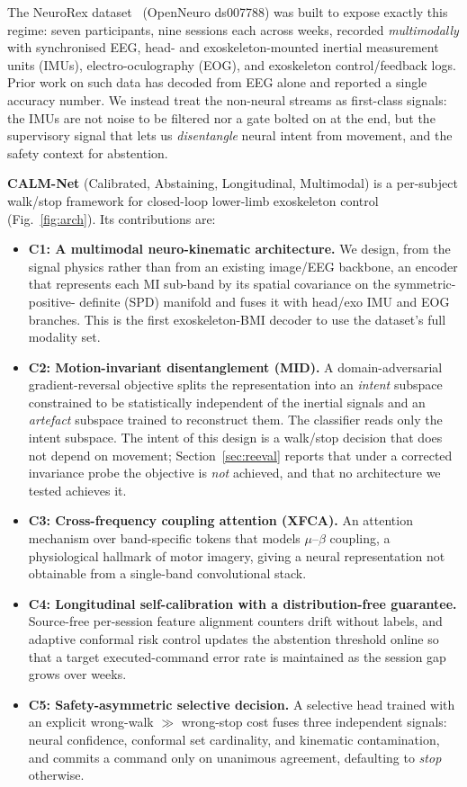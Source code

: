 \documentclass[journal]{IEEEtran}
\begin{document}
The NeuroRex dataset~\cite{sarkar2026} (OpenNeuro ds007788) was built to expose
exactly this regime: seven participants, nine sessions each across weeks, recorded
\emph{multimodally} with synchronised EEG, head- and exoskeleton-mounted inertial
measurement units (IMUs), electro-oculography (EOG), and exoskeleton control/feedback
logs. Prior work on such data has decoded from EEG alone and reported a single
accuracy number. We instead treat the non-neural streams as first-class signals: the
IMUs are not noise to be filtered nor a gate bolted on at the end, but the supervisory
signal that lets us \emph{disentangle} neural intent from movement, and the safety
context for abstention.

\textbf{CALM-Net} (Calibrated, Abstaining, Longitudinal, Multimodal) is a per-subject
walk/stop framework for closed-loop lower-limb exoskeleton control
(Fig.~\ref{fig:arch}). Its contributions are:
\begin{itemize}
\item \textbf{C1: A multimodal neuro-kinematic architecture.} We design, from the
signal physics rather than from an existing image/EEG backbone, an encoder that
represents each MI sub-band by its spatial covariance on the symmetric-positive-
definite (SPD) manifold and fuses it with head/exo IMU and EOG branches. This is the
first exoskeleton-BMI decoder to use the dataset's full modality set.
\item \textbf{C2: Motion-invariant disentanglement (MID).} A domain-adversarial
gradient-reversal objective splits the representation into an \emph{intent} subspace
constrained to be statistically independent of the inertial signals and an
\emph{artefact} subspace trained to reconstruct them. The classifier reads only the
intent subspace. The intent of this design is a walk/stop decision that does not
depend on movement; Section~\ref{sec:reeval} reports that under a corrected
invariance probe the objective is \emph{not} achieved, and that no architecture we
tested achieves it.
\item \textbf{C3: Cross-frequency coupling attention (XFCA).} An attention
mechanism over band-specific tokens that models $\mu$--$\beta$ coupling, a
physiological hallmark of motor imagery, giving a neural representation not obtainable
from a single-band convolutional stack.
\item \textbf{C4: Longitudinal self-calibration with a distribution-free
guarantee.} Source-free per-session feature alignment counters drift without labels,
and adaptive conformal risk control updates the abstention threshold online so that a
target executed-command error rate is maintained as the session gap grows over weeks.
\item \textbf{C5: Safety-asymmetric selective decision.} A selective head trained
with an explicit wrong-walk $\gg$ wrong-stop cost fuses three independent signals: 
neural confidence, conformal set cardinality, and kinematic contamination, and
commits a command only on unanimous agreement, defaulting to \emph{stop} otherwise.
\end{itemize}
\end{document}
